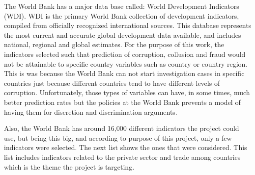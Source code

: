 The World Bank has a major data base called: World Development Indicators (WDI). WDI is the primary World Bank collection of development indicators, compiled from officially recognized international sources. This database represents the most current and accurate global development data available, and includes national, regional and global estimates. For the purpose of this work, the indicators selected such that prediction of corruption, collusion and fraud would not be attainable to specific country variables such as country or country region. This is was because the World Bank can not start investigation cases in specific countries just because different countries tend to have different levels of corruption. Unfortunately, those types of variables can have, in some times, much better prediction rates but the policies at the World Bank prevents a model of having them for discretion and discrimination arguments.

Also, the World Bank has around 16,000 different indicators the project could use, but being this big, and according to purpose of this project, only a few indicators were selected. The next list shows the ones that were considered. This list includes indicators related to the private sector and trade among countries which is the theme the project is targeting.

